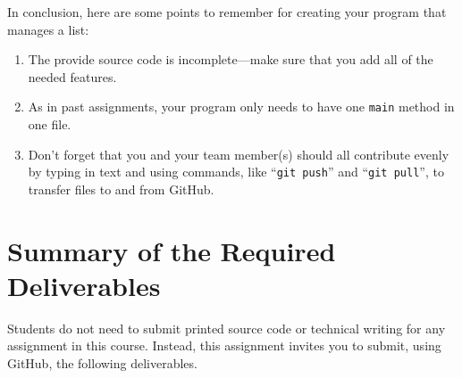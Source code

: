\documentclass[11pt]{article}
\newcommand{\command}[1]{``\lstinline{#1}''}
\begin{document}
\noindent
In conclusion, here are some points to remember for creating your program that manages a list:

\begin{enumerate}
  \setlength{\itemsep}{0pt}

\item The provide source code is incomplete---make sure that you add all of the needed features.

\item As in past assignments, your program only needs to have one {\tt main} method in one file.

\item Don't forget that you and your team member(s) should all contribute evenly by typing in text and using commands,
  like \command{git push} and \command{git pull}, to transfer files to and from GitHub.

\end{enumerate}

\section*{Summary of the Required Deliverables}

\noindent Students do not need to submit printed source code or technical writing for any assignment in this course.
Instead, this assignment invites you to submit, using GitHub, the following deliverables.
\end{document}
